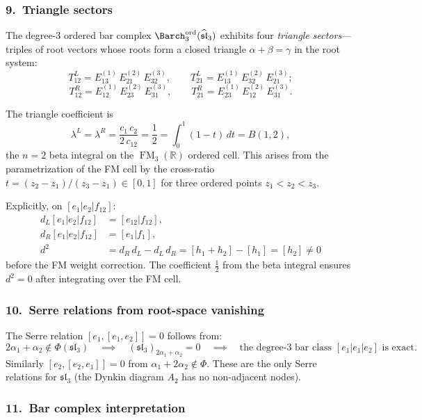 \subsubsection*{9.\ Triangle sectors}

The degree-$3$ ordered bar complex
$\Barch_3^{\mathrm{ord}}(\widehat{\mathfrak{sl}}_3)$
exhibits four \emph{triangle sectors}---triples of root vectors
whose roots form a closed triangle
$\alpha + \beta = \gamma$ in the root system:
\[
T^L_{12} = E_{13}^{(1)}\,E_{21}^{(2)}\,E_{32}^{(3)},
\qquad
T^L_{21} = E_{13}^{(1)}\,E_{32}^{(2)}\,E_{21}^{(3)};
\]
\[
T^R_{12} = E_{12}^{(1)}\,E_{23}^{(2)}\,E_{31}^{(3)},
\qquad
T^R_{21} = E_{23}^{(1)}\,E_{12}^{(2)}\,E_{31}^{(3)}.
\]

The triangle coefficient is
\begin{equation}\label{eq:triangle-half}
\lambda^L = \lambda^R
= \frac{c_1\,c_2}{2\,c_{12}}
= \frac{1}{2}
= \int_0^1 (1-t)\,dt
= B(1,2),
\end{equation}
the $n=2$ beta integral on the $\operatorname{FM}_3(\mathbb{R})$ ordered cell.
This arises from the parametrization of the FM cell
by the cross-ratio $t = (z_2 - z_1)/(z_3 - z_1) \in [0,1]$
for three ordered points $z_1 < z_2 < z_3$.

Explicitly, on $[e_1 | e_2 | f_{12}]$:
\begin{align*}
d_L[e_1|e_2|f_{12}] &= [e_{12} | f_{12}], \\
d_R[e_1|e_2|f_{12}] &= [e_1 | f_1], \\
d^2 &= d_R\,d_L - d_L\,d_R
= [h_1 + h_2] - [h_1] = [h_2] \neq 0
\end{align*}
before the FM weight correction.  The coefficient $\tfrac{1}{2}$
from the beta integral ensures $d^2 = 0$ after integrating over
the FM cell.

\subsubsection*{10.\ Serre relations from root-space vanishing}

The Serre relation $[e_1, [e_1, e_2]] = 0$ follows from:
\[
2\alpha_1 + \alpha_2 \notin \Phi(\mathfrak{sl}_3)
\quad\implies\quad
(\mathfrak{sl}_3)_{2\alpha_1 + \alpha_2} = 0
\quad\implies\quad
\text{the degree-3 bar class } [e_1|e_1|e_2]
\text{ is exact}.
\]
Similarly $[e_2,[e_2,e_1]] = 0$ from
$\alpha_1 + 2\alpha_2 \notin \Phi$.
These are the only Serre relations for $\mathfrak{sl}_3$
(the Dynkin diagram $A_2$ has no non-adjacent nodes).

\subsubsection*{11.\ Bar complex interpretation}

